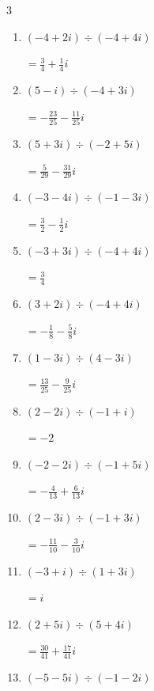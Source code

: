 \begin{multicols}{3}
\begin{enumerate}
  \item $\displaystyle (-4+2i)\div(-4+4i)$

        $\displaystyle =\frac{3}{4}+\frac{1}{4}i$

  \item $\displaystyle (5-i)\div(-4+3i)$

        $\displaystyle =-\frac{23}{25}-\frac{11}{25}i$

  \item $\displaystyle (5+3i)\div(-2+5i)$

        $\displaystyle =\frac{5}{29}-\frac{31}{29}i$

\columnbreak %

  \item $\displaystyle (-3-4i)\div(-1-3i)$

        $\displaystyle =\frac{3}{2}-\frac{1}{2}i$

  \item $\displaystyle (-3+3i)\div(-4+4i)$

        $\displaystyle =\frac{3}{4}$

  \item $\displaystyle (3+2i)\div(-4+4i)$

        $\displaystyle =-\frac{1}{8}-\frac{5}{8}i$

  \item $\displaystyle (1-3i)\div(4-3i)$

        $\displaystyle =\frac{13}{25}-\frac{9}{25}i$

  \item $\displaystyle (2-2i)\div(-1+i)$

        $\displaystyle =-2$

  \item $\displaystyle (-2-2i)\div(-1+5i)$

        $\displaystyle =-\frac{4}{13}+\frac{6}{13}i$

  \item $\displaystyle (2-3i)\div(-1+3i)$

        $\displaystyle =-\frac{11}{10}-\frac{3}{10}i$

  \item $\displaystyle (-3+i)\div(1+3i)$

        $\displaystyle =i$

  \item $\displaystyle (2+5i)\div(5+4i)$

        $\displaystyle =\frac{30}{41}+\frac{17}{41}i$

  \item $\displaystyle (-5-5i)\div(-1-2i)$


\end{enumerate}
\end{multicols}

